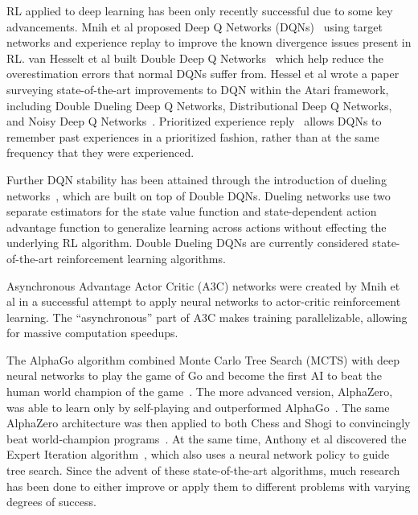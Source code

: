 \documentclass[letterpaper]{article} %
\begin{document}
RL applied to deep learning has been only recently successful due to some key advancements. 
Mnih et al proposed Deep Q Networks (DQNs)~\cite{mnih2015human} using target networks and experience replay to improve the known divergence issues present in RL. 
van Hesselt et al built Double Deep Q Networks~\cite{van2016deep} which help reduce the overestimation errors that normal DQNs suffer from. Hessel et al wrote a paper surveying state-of-the-art improvements to DQN within the Atari framework, including Double Dueling Deep Q Networks, Distributional Deep Q Networks, and Noisy Deep Q Networks~\cite{hessel2017rainbow}.
Prioritized experience reply~\cite{schaul2015prioritized} allows DQNs to remember past experiences in a prioritized fashion, rather than at the same frequency that they were experienced.

Further DQN stability has been attained through the introduction of dueling networks~\cite{wang2016dueling}, which are built on top of Double DQNs. Dueling networks use two separate estimators for the state value function and state-dependent action advantage function to generalize learning across actions without effecting the underlying RL algorithm. Double Dueling DQNs are currently considered state-of-the-art reinforcement learning algorithms.

Asynchronous Advantage Actor Critic (A3C) networks were created by Mnih et al in a successful attempt to apply neural networks to actor-critic reinforcement learning. The ``asynchronous'' part of A3C makes training parallelizable, allowing for massive computation speedups.

The AlphaGo algorithm combined Monte Carlo Tree Search (MCTS) with deep neural networks to play the game of Go and become the first AI to beat the human world champion of the game~\cite{silver2016mastering}. 
The more advanced version, AlphaZero, was able to learn only by self-playing and outperformed AlphaGo~\cite{silver2017mastering}. The same AlphaZero architecture was then applied to both Chess and Shogi to convincingly beat world-champion programs~\cite{silver2017masteringchess}. 
At the same time, Anthony et al discovered the Expert Iteration algorithm~\cite{anthony2017thinking}, which also uses a neural network policy to guide tree search. Since the advent of these state-of-the-art algorithms, much research has been done to either improve or apply them to different problems with varying degrees of success.
\end{document}
